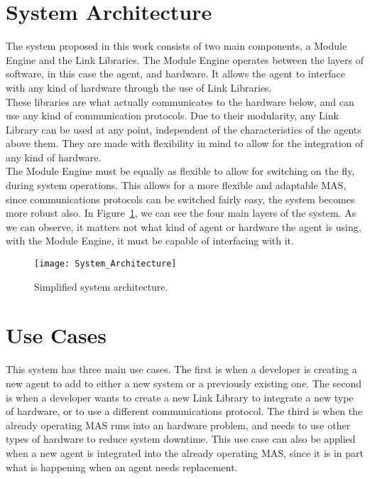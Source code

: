 \section{System Architecture}
\label{sec:developed_architecture}

The system proposed in this work consists of two main components, a Module Engine and the Link Libraries. The Module Engine operates between the layers of software, in this case the agent, and hardware. It allows the agent to interface with any kind of hardware through the use of Link Libraries.\\

These libraries are what actually communicates to the hardware below, and can use any kind of communication protocols. Due to their modularity, any Link Library can be used at any point, independent of the characteristics of the agents above them. They are made with flexibility in mind to allow for the integration of any kind of hardware.\\

The Module Engine must be equally as flexible to allow for switching on the fly, during system operations. This allows for a more flexible and adaptable \acrshort{MAS}, since communications protocols can be switched fairly easy, the system becomes more robust also. In Figure~\ref{fig:system_architecture}, we can see the four main layers of the system. As we can observe, it matters not what kind of agent or hardware the agent is using, with the Module Engine, it must be capable of interfacing with it. 

\begin{figure}[h!]
	\centering
	\texttt{[image: System\_Architecture]}
	\caption{Simplified system architecture.}
	\label{fig:system_architecture}
\end{figure}

\section{Use Cases}
\label{sec:use_cases}

This system has three main use cases. The first is when a developer is creating a new agent to add to either a new system or a previously existing one. The second is when a developer wants to create a new Link Library to integrate a new type of hardware, or to use a different communications protocol. The third is when the already operating \acrshort{MAS} runs into an hardware problem, and needs to use other types of hardware to reduce system downtime. This use case can also be applied when a new agent is integrated into the already operating \acrshort{MAS}, since it is in part what is happening when an agent needs replacement.\\

